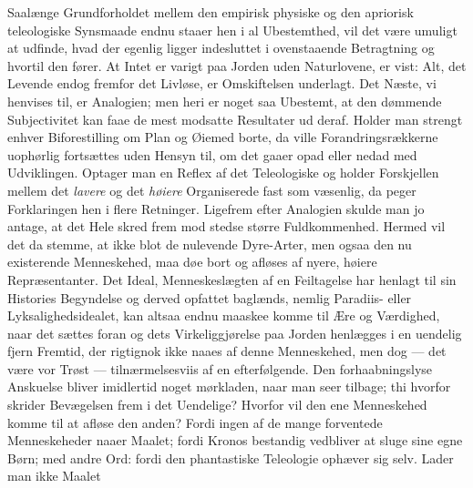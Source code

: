 \documentclass[12pt,a4paper]{book}
\begin{document}
Saalænge Grundforholdet mellem den empirisk physiske og den apriorisk
teleologiske Synsmaade endnu staaer hen i al Ubestemthed, vil det være umuligt
at udfinde, hvad der egenlig ligger indesluttet i ovenstaaende Betragtning og
hvortil den fører. At Intet er varigt paa Jorden uden Naturlovene, er vist:
Alt, det Levende endog fremfor det Livløse, er Omskiftelsen underlagt. Det
Næste, vi henvises til, er Analogien; men heri er noget saa Ubestemt, at den
dømmende Subjectivitet kan faae de mest modsatte Resultater ud deraf. Holder
man strengt enhver Biforestilling om Plan og Øiemed borte, da ville
Forandringsrækkerne uophørlig fortsættes uden Hensyn til, om det gaaer opad
eller nedad med Udviklingen. Optager man en Reflex af det Teleologiske og
holder Forskjellen mellem det \emph{lavere} og det \emph{høiere} Organiserede
fast som væsenlig, da peger Forklaringen hen i flere Retninger. Ligefrem efter
Analogien skulde man jo antage, at det Hele skred frem mod stedse større
Fuldkommenhed. Hermed vil det da stemme, at ikke blot de nulevende
Dyre-Arter, men ogsaa den nu existerende Menneskehed, maa døe bort og afløses
af nyere, høiere Repræsentanter. Det Ideal, Menneskeslægten af en Feiltagelse
har henlagt til sin Histories Begyndelse og derved opfattet baglænds, nemlig
Paradiis- eller Lyksalighedsidealet, kan altsaa endnu maaskee komme til Ære og
Værdighed, naar
det sættes foran og dets Virkeliggjørelse paa Jorden henlægges i en uendelig
fjern Fremtid, der rigtignok ikke naaes af denne Menneskehed, men dog --- det
være vor Trøst --- tilnærmelsesviis af en efterfølgende. Den forhaabningslyse
Anskuelse bliver imidlertid noget mørkladen, naar man seer tilbage; thi hvorfor
skrider Bevægelsen frem i det Uendelige? Hvorfor vil den ene Menneskehed komme
til at afløse den anden? Fordi ingen af de mange forventede Menneskeheder naaer
Maalet; fordi Kronos bestandig vedbliver at sluge sine egne Børn; med andre
Ord: fordi den phantastiske Teleologie ophæver sig selv. Lader man ikke Maalet
\end{document}
